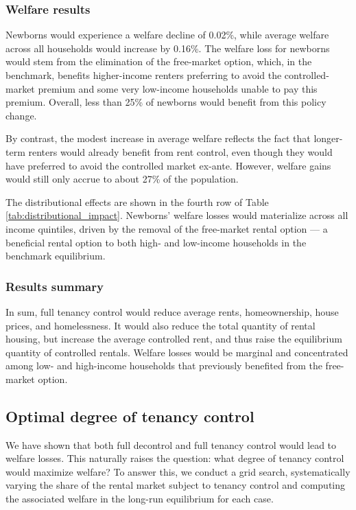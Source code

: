 \documentclass[parskip=full]{article}
\begin{document}
\subsubsection{Welfare results}

Newborns would experience a welfare decline of 0.02\%, while average welfare across all households would increase by 0.16\%. The welfare loss for newborns would stem from the elimination of the free-market option, which, in the benchmark, benefits higher-income renters preferring to avoid the controlled-market premium and some very low-income households unable to pay this premium. Overall, less than 25\% of newborns would benefit from this policy change.

By contrast, the modest increase in average welfare reflects the fact that longer-term renters would already benefit from rent control, even though they would have preferred to avoid the controlled market ex-ante. However, welfare gains would still only accrue to about 27\% of the population.

The distributional effects are shown in the fourth row of Table \ref{tab:distributional_impact}. Newborns' welfare losses would materialize across all income quintiles, driven by the removal of the free-market rental option — a beneficial rental option to both high- and low-income households in the benchmark equilibrium.

\subsubsection{Results summary}

In sum, full tenancy control would reduce average rents, homeownership, house prices, and homelessness. It would also reduce the total quantity of rental housing, but increase the average controlled rent, and thus raise the equilibrium quantity of controlled rentals. Welfare losses would be marginal and concentrated among low- and high-income households that previously benefited from the free-market option.

\subsection{Optimal degree of tenancy control}\label{subsection:optimal_control}

We have shown that both full decontrol and full tenancy control would lead to welfare losses. This naturally raises the question: what degree of tenancy control would maximize welfare? To answer this, we conduct a grid search, systematically varying the share of the rental market subject to tenancy control and computing the associated welfare in the long-run equilibrium for each case.
\end{document}
